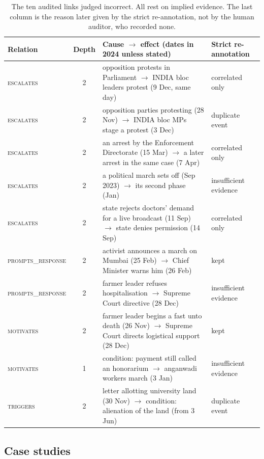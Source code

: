 \documentclass[pdflatex,sn-basic,lineno]{sn-jnl}
\theoremstyle{thmstylethree}
\theoremstyle{thmstyleone}
\newcommand{\rel}[1]{\textsc{#1}}
\begin{document}
\begin{table}[!htbp]
\caption{The ten audited links judged incorrect. All rest on implied evidence. The last column is
the reason later given by the strict re-annotation, not by the human auditor, who recorded none.}
\label{tab:errors}
\footnotesize
\begin{tabularx}{\textwidth}{@{}lcXl@{}}
\toprule
Relation & Depth & Cause $\rightarrow$ effect (dates in 2024 unless stated) & Strict re-annotation \\
\midrule
\rel{escalates} & 2 & opposition protests in Parliament $\rightarrow$ INDIA bloc leaders protest (9 Dec, same day) & correlated only \\
\rel{escalates} & 2 & opposition parties protesting (28 Nov) $\rightarrow$ INDIA bloc MPs stage a protest (3 Dec) & duplicate event \\
\rel{escalates} & 2 & an arrest by the Enforcement Directorate (15 Mar) $\rightarrow$ a later arrest in the same case (7 Apr) & correlated only \\
\rel{escalates} & 2 & a political march sets off (Sep 2023) $\rightarrow$ its second phase (Jan) & insufficient evidence \\
\rel{escalates} & 2 & state rejects doctors' demand for a live broadcast (11 Sep) $\rightarrow$ state denies permission (14 Sep) & correlated only \\
\rel{prompts\_response} & 2 & activist announces a march on Mumbai (25 Feb) $\rightarrow$ Chief Minister warns him (26 Feb) & kept \\
\rel{prompts\_response} & 2 & farmer leader refuses hospitalisation $\rightarrow$ Supreme Court directive (28 Dec) & insufficient evidence \\
\rel{motivates} & 2 & farmer leader begins a fast unto death (26 Nov) $\rightarrow$ Supreme Court directs logistical support (28 Dec) & kept \\
\rel{motivates} & 1 & condition: payment still called an honorarium $\rightarrow$ anganwadi workers march (3 Jan) & insufficient evidence \\
\rel{triggers} & 2 & letter allotting university land (30 Nov) $\rightarrow$ condition: alienation of the land (from 3 Jun) & duplicate event \\
\bottomrule
\end{tabularx}
\end{table}

\subsection{Case studies}
\end{document}
